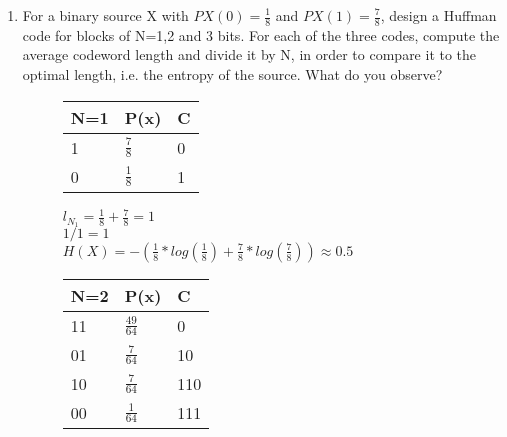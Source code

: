 \documentclass[pdftex,12pt,a4paper]{article}
\begin{document}
\begin{enumerate}
\begin{enumerate}
            \newpage
            \item For a binary source X with $PX(0)=\frac{1}{8}$ and
                $PX(1) =\frac{7}{8}$, design a Huffman code for blocks of
                N=1,2 and 3 bits.
                For each of the three codes, compute the average codeword
                length and divide it by N, in order to compare it to the
                optimal length, i.e. the entropy of the source.
                What do you observe?

                \begin{figure}[h]
                    \begin{minipage}[t]{0.33\linewidth}
                        \centering
                        \begin{tabular}{lll} \toprule
                            N=1 & P(x)           &C  \\ \midrule
                            1   & $\frac{7}{8}$  &0  \\ \midrule
                            0   & $\frac{1}{8}$  &1  \\ \bottomrule
                        \end{tabular}
                        \vspace{0.5cm}

                        $l_{N_1} = \frac{1}{8} + \frac{7}{8} = 1$\\
                        $1 / 1 = 1$\\
                        $H(X) = -(\frac{1}{8} * log(\frac{1}{8}) + \frac{7}{8} * log(\frac{7}{8})) \approx 0.5$
                    \end{minipage}%
                    \begin{minipage}[t]{0.33\linewidth}
                        \centering
                        \begin{tabular}{lll} \toprule
                            N=2 & P(x)              &C   \\ \midrule
                            11  & $\frac{49}{64}$   &0   \\ \midrule
                            01  & $\frac{7}{64}$    &10  \\ \midrule
                            10  & $\frac{7}{64}$    &110 \\ \midrule
                            00  & $\frac{1}{64}$    &111 \\ \bottomrule
                        \end{tabular}
                        \vspace{0.5cm}


\end{minipage}
\end{figure}
\end{enumerate}
\end{enumerate}
\end{document}
